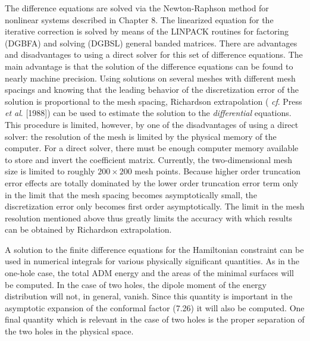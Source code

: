 The difference equations are solved via the Newton-Raphson method for nonlinear
systems described in Chapter 8.  The linearized equation for the iterative
correction is solved by means of the LINPACK routines for factoring (DGBFA)  and
solving (DGBSL) general banded matrices.  There are advantages and disadvantages
to using a direct solver for this set of difference equations.  The main
advantage is that the solution of the difference equations can be found to nearly
machine precision.  Using solutions on several meshes with different mesh
spacings and knowing that the leading behavior of the discretization error of the
solution is proportional to the mesh spacing, Richardson extrapolation ({\it
cf}. Press {\it et al}. [1988]) can be used to estimate the solution to the {\it
differential} equations.  This procedure is limited, however, by one of the
disadvantages of using a direct solver:  the resolution of the mesh is limited
by the physical memory of the computer.  For a direct solver, there must be
enough computer memory available to store and invert the coefficient matrix. 
Currently, the two-dimensional mesh size is limited to roughly $200\times 200$
mesh points.  Because higher order truncation error effects are totally
dominated by the lower order truncation error term only in the limit that the
mesh spacing becomes asymptotically small, the discretization error only becomes
first order asymptotically.  The limit in the mesh resolution mentioned above
thus greatly limits the accuracy with which results can be obtained by
Richardson extrapolation.

A solution to the finite difference equations for the Hamiltonian constraint can
be used in numerical integrals for various physically significant quantities. 
As in the one-hole case, the total ADM energy and the areas of the minimal
surfaces will be computed.  In the case of two holes, the dipole moment of the
energy distribution will not, in general, vanish.  Since this quantity is
important in the asymptotic expansion of the conformal factor (7.26) it will
also be computed.  One final quantity which is relevant in the case of two holes
is the proper separation of the two holes in the physical space.

